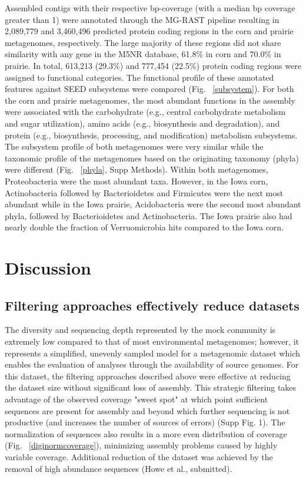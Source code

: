 \documentclass[11pt]{article} %
\begin{document}
Assembled contigs with their respective bp-coverage (with a median bp
coverage greater than 1) were annotated through the MG-RAST pipeline
resulting in 2,089,779 and 3,460,496 predicted protein coding regions
in the corn and prairie metagenomes, respectively.  The large majority
of these regions did not share similarity with any gene in the M5NR
database, 61.8\% in corn and 70.0\% in prairie.  In total, 613,213 (29.3\%) and
777,454 (22.5\%) protein coding regions were assigned to functional categories.
The functional profile of these annotated features against SEED
subsystems were compared (Fig. ~\ref{subsystem}).  For both the corn
and prairie metagenomes, the most abundant functions in the assembly were associated
with the carbohydrate (e.g., central carbohydrate metabolism and sugar
utilization), amino acids (e.g., biosynthesis and degradation), and
protein (e.g., biosynthesis, processing, and modification)
metabolism subsystems.  The subsystem profile of both metagenomes were very
similar while the taxonomic profile of the metagenomes based on the
originating taxonomy (phyla) were different (Fig. ~\ref{phyla}, Supp
Methods).  Within both metagenomes, Proteobacteria were the most
abundant taxa.  However, in the Iowa corn, Actinobacteria followed by
Bacterioidetes and Firmicutes were the next most abundant while in the
Iowa prairie, Acidobacteria were the second most abundant phyla,
followed by Bacterioidetes and Actinobacteria.  The Iowa prairie also
had nearly double the fraction of Verruomicrobia hits compared to the Iowa
corn.


\section{Discussion}

\subsection{Filtering approaches effectively reduce datasets} 

The diversity and sequencing depth represented by the mock community
is extremely low compared to that of most environmental metagenomes;
however, it represents a simplified, unevenly sampled model for a
metagenomic dataset which enables the evaluation of analyses through
the availability of source genomes.  For this dataset, the filtering
approaches described above were effective at reducing the dataset size
without significant loss of assembly.  This strategic filtering takes
advantage of the observed coverage "sweet spot" at which point
sufficient sequences are present for assembly and beyond which further
sequencing is not productive (and increases the number of sources of
errors) (Supp Fig. 1).  The normalization of sequences also results in
a more even distribution of coverage (Fig. ~\ref{diginormcoverage}),
minimizing assembly problems caused by highly variable coverage.
Additional reduction of the dataset was achieved by the removal of
high abundance sequences (Howe et al., submitted).
\end{document}
